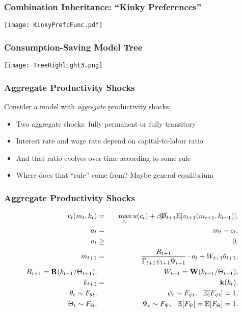 \documentclass[11pt]{cfpbpresentation}
\newcommand{\E}{\mathbb{E}}
\newcommand{\Die}{\mathsf{D}}
\newcommand{\Live}{\cancel{\Die}}
\begin{document}
\begin{frame}
\frametitle{Combination Inheritance: ``Kinky Preferences''}
\begin{center}
\texttt{[image: KinkyPrefcFunc.pdf]}
\end{center}
\end{frame}


\begin{frame}
\frametitle{Consumption-Saving Model Tree}
\begin{center}
\texttt{[image: TreeHighlight3.png]}
\end{center}
\end{frame}


\begin{frame}
\frametitle{Aggregate Productivity Shocks}
Consider a model with \textit{aggregate} productivity shocks:
\begin{itemize}
\item Two aggregate shocks: fully permanent or fully transitory

\item Interest rate and wage rate depend on capital-to-labor ratio

\item And that ratio evolves over time according to some rule

\item Where does that ``rule'' come from?  Maybe general equilibrium
\end{itemize}
\end{frame}

\begin{frame}
\frametitle{Aggregate Productivity Shocks}
\begin{eqnarray*}
v_t(m_t,k_t) &=& \max_{c_t} u(c_t) + \beta \Live_{t+1} \E [v_{t+1}(m_{t+1},k_{t+1}) ], \\
a_t &=& m_t - c_t, \\
a_t &\geq& 0, \\
m_{t+1} &=& \frac{R_{t+1}}{\Gamma_{t+1}\psi_{t+1} \Psi_{t+1}} \cdot a_t + W_{t+1} \theta_{t+1}, \\
R_{t+1} = \textbf{R}(k_{t+1}/\Theta_{t+1}), & & W_{t+1} = \textbf{W}(k_{t+1}/\Theta_{t+1}), \\
k_{t+1} &=& \textbf{k}(k_t), \\
\theta_t \sim F_{\theta t}, &\qquad& \psi_t \sim F_{\psi t}, \hspace{0.25cm} \E[F_{\psi t}] = 1, \\
\Theta_t \sim F_{\Theta}, &\qquad& \Psi_t \sim F_{\Psi}, \hspace{0.25cm} \E[F_{\Psi}] = \E[F_{\Theta}] = 1.
\end{eqnarray*}
\end{frame}
\end{document}
